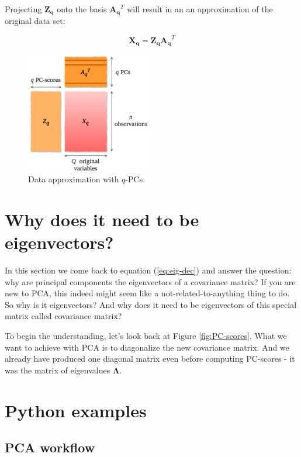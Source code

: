 \documentclass[10pt,twocolumn]{article}
\begin{document}
Projecting $\bm{Z_q}$ onto the basis $\bm{A_q}^T$ will result in an an approximation of the original data set:

\begin{equation} \label{eq:X-approximation}
\bm{X_q} = \bm{Z_q} \bm{A_q}^T
\end{equation}


\begin{figure}[H]
\centering\includegraphics[width=5.5cm]{data-approx.png}
\caption{Data approximation with $q$-PCs.}
\label{fig:data-approx}
\end{figure}




\section{Why does it need to be eigenvectors?}

In this section we come back to equation (\ref{eq:eig-dec}) and answer the question: why are principal components the eigenvectors of a covariance matrix? If you are new to PCA, this indeed might seem like a not-related-to-anything thing to do. So why is it eigenvectors? And why does it need to be eigenvectors of this special matrix called covariance matrix?

To begin the understanding, let's look back at Figure \ref{fig:PC-scores}. What we want to achieve with PCA is to diagonalize the new covariance matrix. And we already have produced one diagonal matrix even before computing PC-scores - it was the matrix of eigenvalues $\bm{\Lambda}$.


\newpage

\section{Python examples}

\subsection{PCA workflow}\label{sec:pca-workflow}
\end{document}
